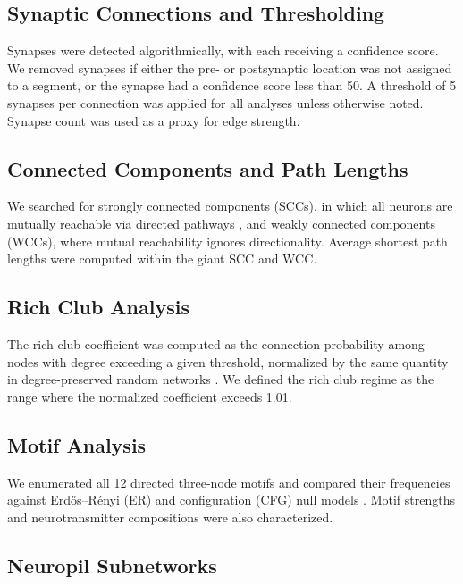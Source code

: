\documentclass{article}
\begin{document}
\subsection{Synaptic Connections and Thresholding}

Synapses were detected algorithmically, with each receiving a confidence score. We removed synapses if either the pre- or postsynaptic location was not assigned to a segment, or the synapse had a confidence score less than 50. A threshold of 5 synapses per connection was applied for all analyses unless otherwise noted. Synapse count was used as a proxy for edge strength.

\subsection{Connected Components and Path Lengths}

We searched for strongly connected components (SCCs), in which all neurons are mutually reachable via directed pathways \citep{tarjan1972depth}, and weakly connected components (WCCs), where mutual reachability ignores directionality. Average shortest path lengths were computed within the giant SCC and WCC.

\subsection{Rich Club Analysis}

The rich club coefficient was computed as the connection probability among nodes with degree exceeding a given threshold, normalized by the same quantity in degree-preserved random networks \citep{colizza2006detecting}. We defined the rich club regime as the range where the normalized coefficient exceeds 1.01.

\subsection{Motif Analysis}

We enumerated all 12 directed three-node motifs \citep{milo2002network} and compared their frequencies against Erd\H{o}s--R\'{e}nyi (ER) and configuration (CFG) null models \citep{milo2004motifs}. Motif strengths and neurotransmitter compositions were also characterized.

\subsection{Neuropil Subnetworks}
\end{document}
